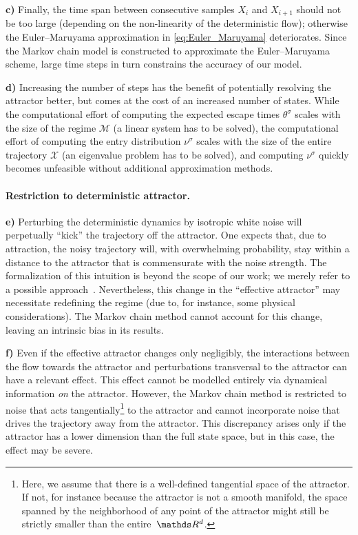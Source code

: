 \textbf{c)} Finally, the time span between consecutive samples $X_i$ and $X_{i+1}$ should not be too large (depending on the non-linearity of the deterministic flow); otherwise the Euler--Maruyama approximation in \cref{eq:Euler_Maruyama} deteriorates. Since the Markov chain model is constructed to approximate the Euler--Maruyama scheme, large time steps in turn constrains the accuracy of our model.

\textbf{d)} Increasing the number of steps has the benefit of potentially resolving the attractor better, but comes at the cost of an increased number of states.
While the computational effort of computing the expected escape times $\theta^\sigma$ scales with the size of the regime $\mathcal{M}$ (a linear system has to be solved), the computational effort of computing the entry distribution $\nu^\sigma$ scales with the size of the entire trajectory $\mathcal{X}$ (an eigenvalue problem has to be solved), and computing $\nu^\sigma$ quickly becomes unfeasible without additional approximation methods.

\paragraph{Restriction to deterministic attractor.}

\textbf{e)} Perturbing the deterministic dynamics by isotropic white noise will perpetually \enquote{kick} the trajectory off the attractor. One expects that, due to attraction, the noisy trajectory will, with overwhelming probability, stay within a distance to the attractor that is commensurate with the noise strength. The formalization of this intuition is beyond the scope of our work; we merely refer to a possible approach~\parencite{blankStochasticAttractorsTheir1986}. Nevertheless, this change in the \enquote{effective attractor} may necessitate redefining the regime (due to, for instance, some physical considerations). The Markov chain method cannot account for this change, leaving an intrinsic bias in its results.

\textbf{f)} Even if the effective attractor changes only negligibly, the interactions between the flow towards the attractor and perturbations transversal to the attractor can have a relevant effect. This effect cannot be modelled entirely via dynamical information \emph{on} the attractor. However, the Markov chain method is restricted to noise that acts tangentially\footnote{Here, we assume that there is a well-defined tangential space of the attractor. If not, for instance because the attractor is not a smooth manifold, the space spanned by the neighborhood of any point of the attractor might still be strictly smaller than the entire~$\R^d$.} to the attractor and cannot incorporate noise that drives the trajectory away from the attractor.
This discrepancy arises only if the attractor has a lower dimension than the full state space, but in this case, the effect may be severe.

